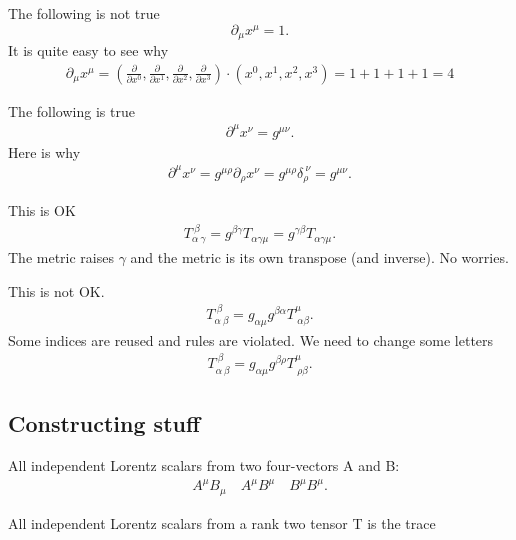 \documentclass[]{amsart}
\begin{document}
The following is not true
\begin{equation}
\partial_\mu x^\mu = 1.
\end{equation}
It is quite easy to see why
\begin{align*}
\partial_\mu x^\mu = (\frac{\partial}{\partial x^0}, \frac{\partial}{\partial x^1}, \frac{\partial}{\partial x^2}, \frac{\partial}{\partial x^3} ) \cdot (x^0, x^1, x^2, x^3) = 1 + 1 +1 +1 = 4
\end{align*}

The following is  true
\begin{align*}
\partial^\mu x^\nu = g^{\mu\nu}.
\end{align*}
Here is why
\begin{align*}
\partial^\mu x^\nu = g^{\mu\rho}\partial_{\rho}x^{\nu} = g^{\mu\rho}\delta_\rho^{\ \nu} = g^{\mu\nu}.
\end{align*}

This is OK
\begin{align*}
T_{\alpha \ \gamma}^{\ \beta} = g^{\beta\gamma}T_{\alpha\gamma\mu} = g^{\gamma\beta}T_{\alpha\gamma\mu}.
\end{align*}
The metric raises $\gamma$ and the metric is its own transpose (and inverse). No worries.

This is not OK.
\begin{align*}
T_{\alpha \ \beta}^{\ \beta} = g_{\alpha\mu}g^{\beta\alpha}T^{\mu}_{\ \alpha\beta}.
\end{align*}
Some indices are reused and rules are violated. We need to change some letters
\begin{align*}
T_{\alpha \ \beta}^{\ \beta} = g_{\alpha\mu}g^{\beta\rho}T^{\mu}_{\ \rho\beta}.
\end{align*}

\subsection{Constructing stuff}
All independent Lorentz scalars from two four-vectors A and B:
\begin{align*}
A^\mu B_\mu \quad A^\mu B^\mu \quad B^\mu B^\mu.
\end{align*}

All independent Lorentz scalars from a rank two tensor T is the trace
\end{document}
